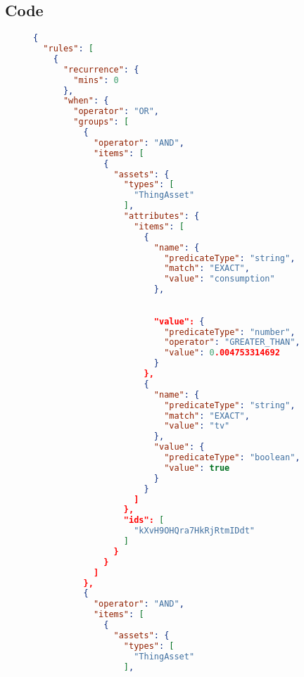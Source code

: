 \begin{appendices}
\chapter{Code}
\begin{figure}[ht]
    \centering
    \begin{lstlisting}[language=json,firstnumber=1]
        {
  "rules": [
    {
      "recurrence": {
        "mins": 0
      },
      "when": {
        "operator": "OR",
        "groups": [
          {
            "operator": "AND",
            "items": [
              {
                "assets": {
                  "types": [
                    "ThingAsset"
                  ],
                  "attributes": {
                    "items": [
                      {
                        "name": {
                          "predicateType": "string",
                          "match": "EXACT",
                          "value": "consumption"
                        },
    \end{lstlisting}
\end{figure}

\begin{figure}[ht]\ContinuedFloat
    \centering
    \begin{lstlisting}[language=json,firstnumber=1]

                        "value": {
                          "predicateType": "number",
                          "operator": "GREATER_THAN",
                          "value": 0.004753314692
                        }
                      },
                      {
                        "name": {
                          "predicateType": "string",
                          "match": "EXACT",
                          "value": "tv"
                        },
                        "value": {
                          "predicateType": "boolean",
                          "value": true
                        }
                      }
                    ]
                  },
                  "ids": [
                    "kXvH9OHQra7HkRjRtmIDdt"
                  ]
                }
              }
            ]
          },
          {
            "operator": "AND",
            "items": [
              {
                "assets": {
                  "types": [
                    "ThingAsset"
                  ],
\end{lstlisting}
\end{figure}


\end{appendices}
